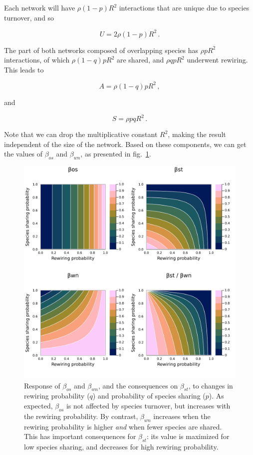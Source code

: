\documentclass[11pt]{article}
\makeatletter
\def\maxwidth{\ifdim\Gin@nat@width>\linewidth\linewidth
\else\Gin@nat@width\fi}
\let\Oldincludegraphics\includegraphics
\renewcommand{\includegraphics}[1]{\Oldincludegraphics[width=\maxwidth]{#1}}
\makeatother
\begin{document}
Each network will have \(\rho(1-p)R^2\) interactions that are unique due
to species turnover, and so

\[U = 2\rho(1-p)R^2\,.\]

The part of both networks composed of overlapping species has
\(\rho pR^2\) interactions, of which \(\rho (1-q) p R^2\) are shared,
and \(\rho qp R^2\) underwent rewiring. This leads to

\[A = \rho (1-q) p R^2\,,\]

and

\[S = \rho pq R^2\,.\]

Note that we can drop the multiplicative constant \(R^2\), making the
result independent of the size of the network. Based on these
components, we can get the values of \(\beta_{os}\) and \(\beta_{wn}\),
as presented in fig.~\ref{fig:numexp2}.

\begin{figure}
\hypertarget{fig:numexp2}{%
\centering
\includegraphics{figures/numexp2.png}
\caption{Response of \(\beta_{os}\) and \(\beta_{wn}\), and the
consequences on \(\beta_{st}\), to changes in rewiring probability
(\(q\)) and probability of species sharing (\(p\)). As expected,
\(\beta_{os}\) is not affected by species turnover, but increases with
the rewiring probability. By contrast, \(\beta_{wn}\) increases when the
rewiring probability is higher \emph{and} when fewer species are shared.
This has important consequences for \(\beta_{st}\): its value is
maximized for low species sharing, and decreases for high rewiring
probability.}\label{fig:numexp2}
}
\end{figure}
\end{document}
